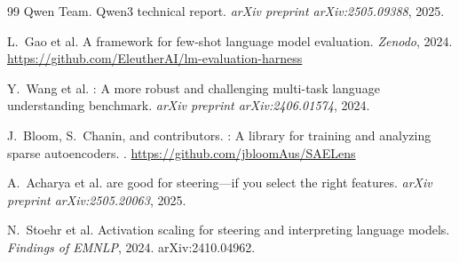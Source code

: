 \documentclass[11pt,a4paper]{article}
\begin{document}
\begin{thebibliography}{99}
Qwen Team.
\newblock Qwen3 technical report.
\newblock \textit{arXiv preprint arXiv:2505.09388}, 2025.

L.~Gao et al.
\newblock A framework for few-shot language model evaluation.
\newblock \textit{Zenodo}, 2024.
\newblock \url{https://github.com/EleutherAI/lm-evaluation-harness}

Y.~Wang et al.
: A more robust and challenging multi-task language understanding benchmark.
\newblock \textit{arXiv preprint arXiv:2406.01574}, 2024.

J.~Bloom, S.~Chanin, and contributors.
: A library for training and analyzing sparse autoencoders.
.
\newblock \url{https://github.com/jbloomAus/SAELens}

A.~Acharya et al.
 are good for steering---if you select the right features.
\newblock \textit{arXiv preprint arXiv:2505.20063}, 2025.

N.~Stoehr et al.
\newblock Activation scaling for steering and interpreting language models.
\newblock \textit{Findings of EMNLP}, 2024.
\newblock arXiv:2410.04962.

\end{thebibliography}
\end{document}
